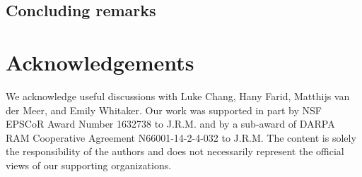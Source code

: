 \documentclass[english]{article}
\begin{document}


\subsection*{Concluding remarks}

\section*{Acknowledgements}
We acknowledge useful discussions with Luke Chang, Hany Farid,
Matthijs van der Meer, and Emily Whitaker. Our work was supported in
part by NSF EPSCoR Award Number 1632738 to J.R.M. and by a sub-award
of DARPA RAM Cooperative Agreement N66001-14-2-4-032 to J.R.M.  The
content is solely the responsibility of the authors and does not
necessarily represent the official views of our supporting
organizations.



\end{document}
